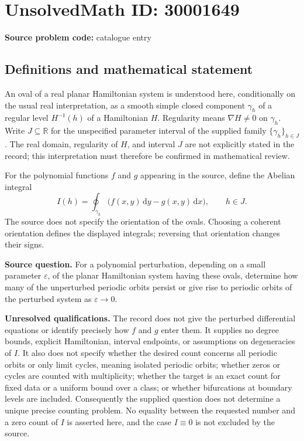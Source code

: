 \documentclass[11pt]{article}
\newcommand{\R}{\mathbb{R}}
\begin{document}
\section*{UnsolvedMath ID: 30001649}
\textbf{Source problem code:} catalogue entry
\subsection{Definitions and mathematical statement}
An oval of a real planar Hamiltonian system is understood here, conditionally on the usual real interpretation, as a smooth simple closed component \(\gamma_h\) of a regular level \(H^{-1}(h)\) of a Hamiltonian \(H\). Regularity means \(\nabla H\ne 0\) on \(\gamma_h\). Write \(J\subseteq\R\) for the unspecified parameter interval of the supplied family \(\{\gamma_h\}_{h\in J}\). The real domain, regularity of \(H\), and interval \(J\) are not explicitly stated in the record; this interpretation must therefore be confirmed in mathematical review.

For the polynomial functions \(f\) and \(g\) appearing in the source, define the Abelian integral
\[
I(h)=\oint_{\gamma_h}\bigl(f(x,y)\,\mathrm{d}y-g(x,y)\,\mathrm{d}x\bigr),\qquad h\in J.
\]
The source does not specify the orientation of the ovals. Choosing a coherent orientation defines the displayed integrals; reversing that orientation changes their signs.

\textbf{Source question.} For a polynomial perturbation, depending on a small parameter \(\varepsilon\), of the planar Hamiltonian system having these ovals, determine how many of the unperturbed periodic orbits persist or give rise to periodic orbits of the perturbed system as \(\varepsilon\to0\).

\textbf{Unresolved qualifications.} The record does not give the perturbed differential equations or identify precisely how \(f\) and \(g\) enter them. It supplies no degree bounds, explicit Hamiltonian, interval endpoints, or assumptions on degeneracies of \(I\). It also does not specify whether the desired count concerns all periodic orbits or only limit cycles, meaning isolated periodic orbits; whether zeros or cycles are counted with multiplicity; whether the target is an exact count for fixed data or a uniform bound over a class; or whether bifurcations at boundary levels are included. Consequently the supplied question does not determine a unique precise counting problem. No equality between the requested number and a zero count of \(I\) is asserted here, and the case \(I\equiv0\) is not excluded by the source.
\end{document}
